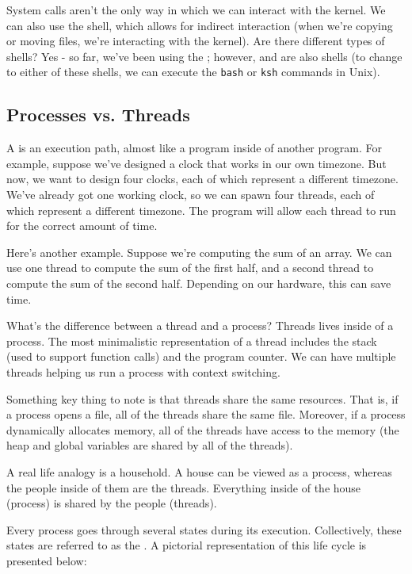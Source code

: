 System calls aren't the only way in which we can interact with the kernel. We can also use the shell, which allows for indirect interaction (when we're copying or moving files, we're interacting with the kernel). Are there different types of shells? Yes - so far, we've been using the ; however,  and  are also shells (to change to either of these shells, we can execute the \verb!bash! or \verb!ksh! commands in Unix).


\subsection{Processes vs. Threads}

A  is an execution path, almost like a program inside of another program. For example, suppose we've designed a clock that works in our own timezone. But now, we want to design four clocks, each of which represent a different timezone. We've already got one working clock, so we can spawn four threads, each of which represent a different timezone. The program will allow each thread to run for the correct amount of time.


Here's another example. Suppose we're computing the sum of an array. We can use one thread to compute the sum of the first half, and a second thread to compute the sum of the second half. Depending on our hardware, this can save time. 



What's the difference between a thread and a process? Threads lives inside of a process. The most minimalistic representation of a thread includes the stack (used to support function calls) and the program counter. We can have multiple threads helping us run a process with context switching. 

Something key thing to note is that threads share the same resources. That is, if a process opens a file, all of the threads share the same file. Moreover, if a process dynamically allocates memory, all of the threads have access to the memory (the heap and global variables are shared by all of the threads). 

A real life analogy is a household. A house can be viewed as a process, whereas the people inside of them are the threads. Everything inside of the house (process) is shared by the people (threads). 


Every process goes through several states during its execution. Collectively, these states are referred to as the . A pictorial representation of this life cycle is presented below:

